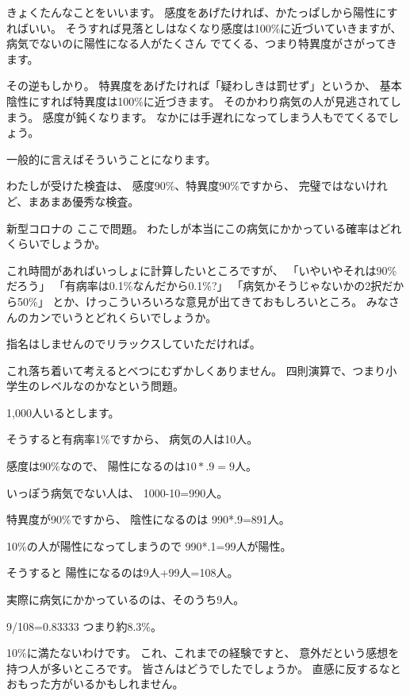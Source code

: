 \documentclass[uplatex,jis2004,dvipdfmx,12pt]{jsarticle}
\begin{document}
きょくたんなことをいいます。
感度をあげたければ、かたっぱしから陽性にすればいい。
そうすれば見落としはなくなり感度は100\%に近づいていきますが、
病気でないのに陽性になる人がたくさん
でてくる、つまり特異度がさがってきます。

その逆もしかり。
特異度をあげたければ「疑わしきは罰せず」というか、
基本陰性にすれば特異度は100\%に近づきます。
そのかわり病気の人が見逃されてしまう。
感度が鈍くなります。
なかには手遅れになってしまう人もでてくるでしょう。

一般的に言えばそういうことになります。

わたしが受けた検査は、
感度90\%、特異度90\%ですから、
完璧ではないけれど、まあまあ優秀な検査。

新型コロナの
ここで問題。
わたしが本当にこの病気にかかっている確率はどれくらいでしょうか。

これ時間があればいっしょに計算したいところですが、
「いやいやそれは90\%だろう」
「有病率は0.1\%なんだから0.1\%?」
「病気かそうじゃないかの2択だから50\%」
とか、けっこういろいろな意見が出てきておもしろいところ。
みなさんのカンでいうとどれくらいでしょうか。

指名はしませんのでリラックスしていただければ。

これ落ち着いて考えるとべつにむずかしくありません。
四則演算で、つまり小学生のレベルなのかなという問題。


1,000人いるとします。

そうすると有病率1\%ですから、
病気の人は10人。


感度は90\%なので、
陽性になるのは$10*.9=9$人。


いっぽう病気でない人は、
1000-10=990人。

特異度が90\%ですから、
陰性になるのは
990*.9=891人。

10\%の人が陽性になってしまうので
990*.1=99人が陽性。

そうすると
陽性になるのは9人+99人=108人。

実際に病気にかかっているのは、そのうち9人。

9/108=0.83333
つまり約8.3\%。

10\%に満たないわけです。
これ、これまでの経験ですと、
意外だという感想を持つ人が多いところです。
皆さんはどうでしたでしょうか。
直感に反するなとおもった方がいるかもしれません。


\bigskip
\end{document}
